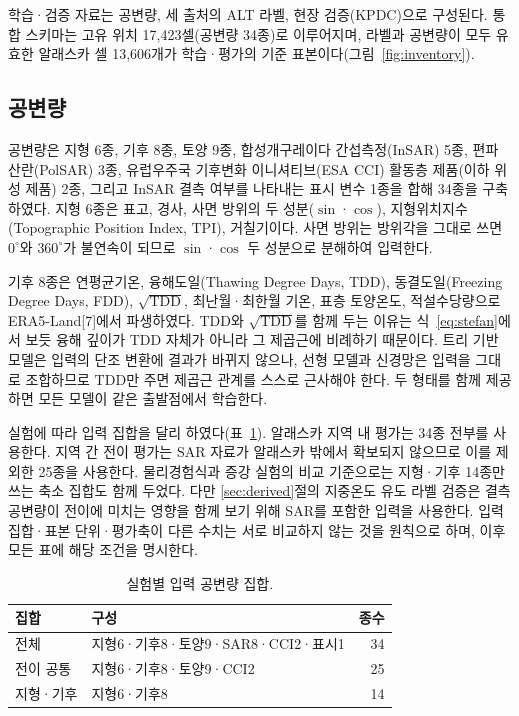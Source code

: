 \documentclass[10pt,twocolumn]{article}
\newcommand{\tabhead}[1]{\textbf{#1}}
\begin{document}
학습·검증 자료는 공변량, 세 출처의 ALT 라벨, 현장 검증(KPDC)으로 구성된다. 통합 스키마는 고유 위치 17{,}423셀(공변량 34종)로 이루어지며, 라벨과 공변량이 모두 유효한 알래스카 셀 13{,}606개가 학습·평가의 기준 표본이다(그림~\ref{fig:inventory}).

\subsection{공변량}
공변량은 지형 6종, 기후 8종, 토양 9종, 합성개구레이다 간섭측정(InSAR) 5종, 편파 산란(PolSAR) 3종, 유럽우주국 기후변화 이니셔티브(ESA CCI) 활동층 제품(이하 위성 제품) 2종, 그리고 InSAR 결측 여부를 나타내는 표시 변수 1종을 합해 34종을 구축하였다. 지형 6종은 표고, 경사, 사면 방위의 두 성분($\sin$·$\cos$), 지형위치지수(Topographic Position Index, TPI), 거칠기이다. 사면 방위는 방위각을 그대로 쓰면 $0^\circ$와 $360^\circ$가 불연속이 되므로 $\sin$·$\cos$ 두 성분으로 분해하여 입력한다.

기후 8종은 연평균기온, 융해도일(Thawing Degree Days, TDD), 동결도일(Freezing Degree Days, FDD), $\sqrt{\mathrm{TDD}}$, 최난월·최한월 기온, 표층 토양온도, 적설수당량으로 ERA5-Land[7]에서 파생하였다. TDD와 $\sqrt{\mathrm{TDD}}$를 함께 두는 이유는 식~\eqref{eq:stefan}에서 보듯 융해 깊이가 TDD 자체가 아니라 그 제곱근에 비례하기 때문이다. 트리 기반 모델은 입력의 단조 변환에 결과가 바뀌지 않으나, 선형 모델과 신경망은 입력을 그대로 조합하므로 $\mathrm{TDD}$만 주면 제곱근 관계를 스스로 근사해야 한다. 두 형태를 함께 제공하면 모든 모델이 같은 출발점에서 학습한다.

실험에 따라 입력 집합을 달리 하였다(표~\ref{tab:featset}). 알래스카 지역 내 평가는 34종 전부를 사용한다. 지역 간 전이 평가는 SAR 자료가 알래스카 밖에서 확보되지 않으므로 이를 제외한 25종을 사용한다. 물리경험식과 증강 실험의 비교 기준으로는 지형·기후 14종만 쓰는 축소 집합도 함께 두었다. 다만 \ref{sec:derived}절의 지중온도 유도 라벨 검증은 결측 공변량이 전이에 미치는 영향을 함께 보기 위해 SAR를 포함한 입력을 사용한다. 입력 집합·표본 단위·평가축이 다른 수치는 서로 비교하지 않는 것을 원칙으로 하며, 이후 모든 표에 해당 조건을 명시한다.

\begin{table}[H]
\centering
\footnotesize
\caption{실험별 입력 공변량 집합.}
\label{tab:featset}
\begin{tabular}{@{}llr@{}}
\toprule
\tabhead{집합} & \tabhead{구성} & \tabhead{종수} \\
\midrule
전체 & 지형6·기후8·토양9·SAR8·CCI2·표시1 & 34 \\
전이 공통 & 지형6·기후8·토양9·CCI2 & 25 \\
지형·기후 & 지형6·기후8 & 14 \\
\bottomrule
\end{tabular}
\end{table}
\end{document}
